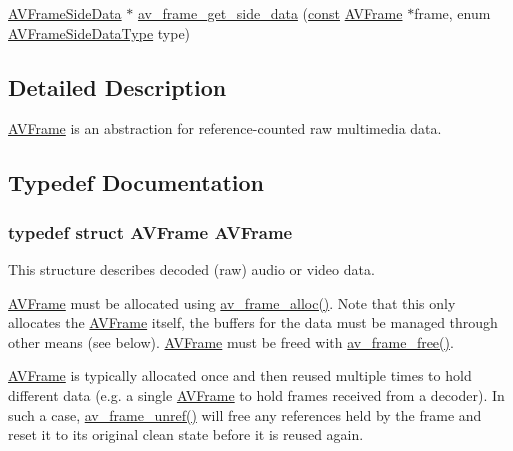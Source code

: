 \begin{DoxyCompactItemize}
\item 
\hyperlink{struct_a_v_frame_side_data}{A\+V\+Frame\+Side\+Data} $\ast$ \hyperlink{group__lavu__frame_gadec0efb470b1eead6a979333d9deca0c}{av\+\_\+frame\+\_\+get\+\_\+side\+\_\+data} (\hyperlink{getopt1_8c_a2c212835823e3c54a8ab6d95c652660e}{const} \hyperlink{struct_a_v_frame}{A\+V\+Frame} $\ast$frame, enum \hyperlink{group__lavu__frame_gae01fa7e427274293aacdf2adc17076bc}{A\+V\+Frame\+Side\+Data\+Type} type)
\end{DoxyCompactItemize}


\subsection{Detailed Description}
\hyperlink{struct_a_v_frame}{A\+V\+Frame} is an abstraction for reference-\/counted raw multimedia data. 

\subsection{Typedef Documentation}
\subsubsection[{\texorpdfstring{A\+V\+Frame}{AVFrame}}]{\setlength{\rightskip}{0pt plus 5cm}typedef struct {\bf A\+V\+Frame}  {\bf A\+V\+Frame}}\hypertarget{group__lavu__frame_gac2c5a41a89d6c9cfeb3bd87af9f98502}{}\label{group__lavu__frame_gac2c5a41a89d6c9cfeb3bd87af9f98502}
This structure describes decoded (raw) audio or video data.

\hyperlink{struct_a_v_frame}{A\+V\+Frame} must be allocated using \hyperlink{group__lavu__frame_gac700017c5270c79c1e1befdeeb008b2f}{av\+\_\+frame\+\_\+alloc()}. Note that this only allocates the \hyperlink{struct_a_v_frame}{A\+V\+Frame} itself, the buffers for the data must be managed through other means (see below). \hyperlink{struct_a_v_frame}{A\+V\+Frame} must be freed with \hyperlink{group__lavu__frame_ga979d73f3228814aee56aeca0636e37cc}{av\+\_\+frame\+\_\+free()}.

\hyperlink{struct_a_v_frame}{A\+V\+Frame} is typically allocated once and then reused multiple times to hold different data (e.\+g. a single \hyperlink{struct_a_v_frame}{A\+V\+Frame} to hold frames received from a decoder). In such a case, \hyperlink{group__lavu__frame_ga0a2b687f9c1c5ed0089b01fd61227108}{av\+\_\+frame\+\_\+unref()} will free any references held by the frame and reset it to its original clean state before it is reused again.


